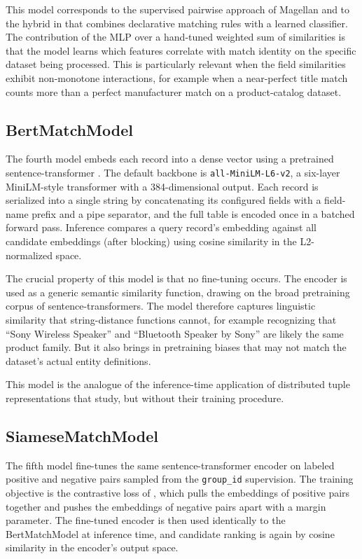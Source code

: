 \documentclass[10pt,letterpaper]{article}
\begin{document}
This model corresponds to the supervised pairwise approach of
Magellan \citep{konda2016} and to the hybrid in \citet{bahmani2017}
that combines declarative matching rules with a learned classifier. The contribution of the MLP over a
hand-tuned weighted sum of similarities is that the model learns which
features correlate with match identity on the specific dataset being
processed. This is particularly relevant when the field similarities
exhibit non-monotone interactions, for example when a near-perfect
title match counts more than a perfect manufacturer match on a
product-catalog dataset.

\subsection{BertMatchModel}

The fourth model embeds each record into a dense vector using a
pretrained sentence-transformer \citep{reimers2019}. The default
backbone is \texttt{all-MiniLM-L6-v2}, a six-layer MiniLM-style
transformer with a 384-dimensional output. Each record is serialized
into a single string by concatenating its configured fields with a
field-name prefix and a pipe separator, and the full table is encoded
once in a batched forward pass. Inference compares a query record's
embedding against all candidate embeddings (after blocking) using
cosine similarity in the L2-normalized space.

The crucial property of this model is that no fine-tuning occurs. The
encoder is used as a generic semantic similarity function, drawing on
the broad pretraining corpus of sentence-transformers. The model
therefore captures linguistic similarity that string-distance
functions cannot, for example recognizing that ``Sony Wireless
Speaker'' and ``Bluetooth Speaker by Sony'' are likely the same
product family. But it also brings in pretraining biases that may not
match the dataset's actual entity definitions.

This model is the analogue of the inference-time application of
distributed tuple representations that \citet{ebraheem2018} study, but
without their training procedure.

\subsection{SiameseMatchModel}

The fifth model fine-tunes the same sentence-transformer encoder on
labeled positive and negative pairs sampled from the
\texttt{group\_id} supervision. The training objective is the
contrastive loss of \citet{hadsell2006}, which pulls the embeddings of
positive pairs together and pushes the embeddings of negative pairs
apart with a margin parameter. The fine-tuned encoder is then used
identically to the BertMatchModel at inference time, and candidate
ranking is again by cosine similarity in the encoder's output space.
\end{document}
